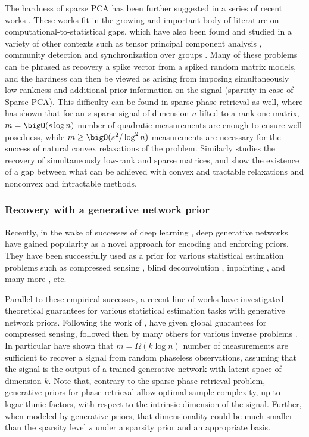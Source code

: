 The hardness of sparse PCA has been further suggested 
in a series of recent works \citep{cai2013sparse,ma2015sum,lesieur2015phase,brennan2019optimal}. 
These works fit in the growing and important body of literature on computational-to-statistical gaps, which have also been found and studied in a variety of other contexts such 
as tensor principal component analysis \citep{richard2014statistical}, community detection \citep{decelle2011asymptotic} and synchronization over groups \citep{perry2018message}.
Many of these problems can be phrased as recovery a spike vector from a spiked random matrix models, and the hardness can then be viewed as arising from imposing 
simultaneously  low-rankness and additional prior information on the signal (sparsity in case of Sparse PCA).
This difficulty can be found in sparse phase retrieval as well, where \cite{li2013sparse}
has shown that for an $s$-sparse signal of dimension $n$ lifted to a rank-one matrix, 
$m = \bigO(s \log n)$ number of quadratic measurements are enough to ensure well-posedness, while $m \geq \bigO(s^2/\log^2 n)$ measurements are necessary 
for the success of natural convex relaxations of the problem.
Similarly \cite{oymak2015simultaneously}  studies the 
recovery of simultaneously low-rank and sparse matrices,
and show the existence of a gap between what can be achieved with convex and tractable relaxations and nonconvex and intractable methods.

\subsubsection*{Recovery with a generative network prior}


Recently, in the wake of successes of deep learning , deep generative networks have 
gained popularity as a novel approach for encoding  and 
enforcing priors. They have been
successfully used as a  prior for various statistical estimation problems 
such as compressed sensing \citep{bora2017compressed},
blind deconvolution \citep{asim2018solving}, inpainting \citep{yeh2016semantic},
and many more \citep{sonderby2016amortised,yang2017dagan,qiu2019robust,xue2018segan}, etc. 

Parallel to these empirical successes, a recent line of  works have investigated
theoretical guarantees for 
various statistical estimation tasks with generative network priors. 
Following the work of \cite{bora2017compressed},
\cite{hand2017global} have given global guarantees for compressed sensing,
followed then by many others for various inverse problems
\citep{shah2018solving,mixon2018sunlayer,hand2019global,aubin2019exact,qiu2019robust}. In particular \cite{hand2018phase} have shown 
that  $m = \Omega(k \log n)$ number of measurements
are sufficient to recover a signal from random phaseless observations, assuming 
that the signal is the output of a trained generative network with latent space of dimension $k$. 
Note that, contrary to the sparse phase retrieval problem, generative priors for phase retrieval allow optimal sample complexity, up to logarithmic factors, with respect to the intrinsic dimension of the signal. Further, when modeled by generative priors, that dimensionality could be much smaller than the sparsity level $s$ under a sparsity prior and an appropriate basis. 

